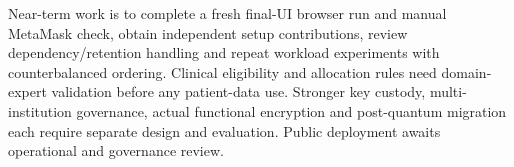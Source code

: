 \documentclass[10pt,twocolumn,a4paper]{article}
\begin{document}
Near-term work is to complete a fresh final-UI browser run and manual MetaMask
check, obtain independent setup contributions, review dependency/retention handling
and repeat workload experiments with counterbalanced ordering. Clinical eligibility
and allocation rules need domain-expert validation before any patient-data use.
Stronger key custody, multi-institution governance, actual functional encryption
and post-quantum migration each require separate design and evaluation. Public
deployment awaits operational and governance review.

\begingroup
\small\raggedright
\newcommand{\BIBdecl}{\setlength{\itemsep}{0pt}\setlength{\parsep}{0pt}\setlength{\parskip}{0pt}}


\endgroup
\end{document}
